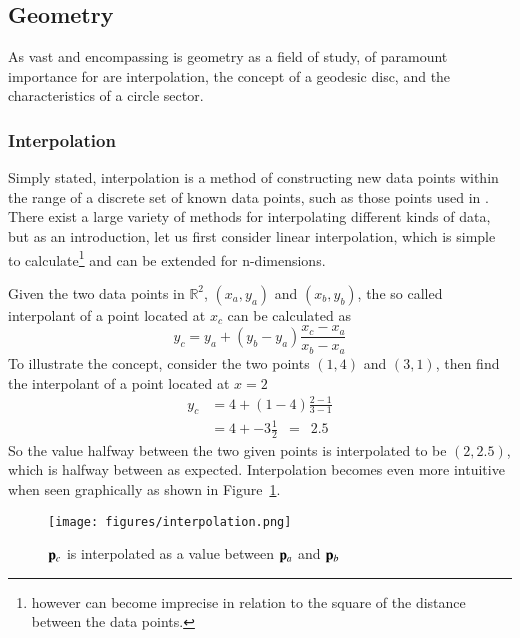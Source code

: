 \subsection{Geometry}
As vast and encompassing is geometry as a field of study, of paramount importance for  are interpolation, the concept of a geodesic disc, and the characteristics of a circle sector.
%
\subsubsection{Interpolation}
Simply stated, interpolation is a method of constructing new data points within the range of a discrete set of known data points, such as those points used in \tdd{}. There exist a large variety of methods for interpolating different kinds of data, but as an introduction, let us first consider linear interpolation, which is simple to calculate\footnote{however can become imprecise in relation to the square of the distance between the data points.} and can be extended for n-dimensions.

Given the two data points in $\mathbb{R}^2$, $(x_a, y_a)$ and $(x_b, y_b)$, the so called interpolant of a point located at $x_c$ can be calculated as
\begin{equation}
	y_c = y_a + (y_b - y_a) \frac{x_c - x_a}{x_b - x_a}
	\label{eq:interpolationGeneral}
\end{equation}
To illustrate the concept, consider the two points $(1, 4)$ and $(3, 1)$, then find the interpolant of a point located at $x = 2$
\begin{align}
	y_c & = 4 + (1 - 4) \frac{2 - 1}{3 - 1} \\
	& = 4 + -3 \frac{1}{2} \enspace = \enspace  2.5	
	\label{eq:interpolationSpecific}
\end{align}
So the value halfway between the two given points is interpolated to be $(2, 2.5)$, which is halfway between as expected. Interpolation becomes even more intuitive when seen graphically as shown in Figure~\ref{fig:interpolation}.
\begin{figure}
\ffigbox
	{\texttt{[image: figures/interpolation.png]}}
	{\caption[Interpolation between two points in $\mathbb{R}^2$]{$\mathbf{p}_c$ is interpolated as a value between $\mathbf{p}_a$ and $\mathbf{p}_b$}\label{fig:interpolation}}
\end{figure}
%
